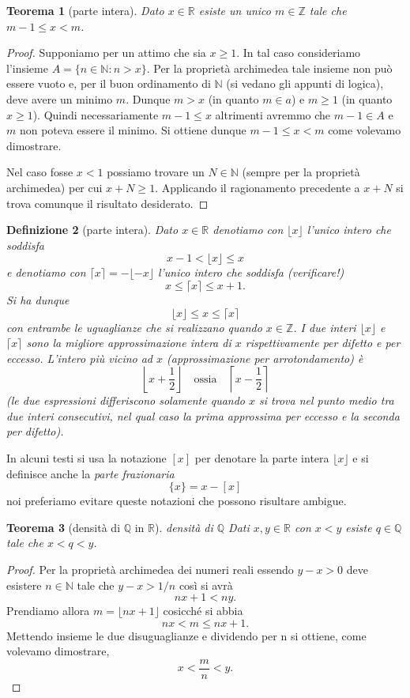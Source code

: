 \documentclass[italian,a4paper,oneside,headinclude]{scrbook}
\newcommand{\NN}{\mathbb N}
\newcommand{\QQ}{\mathbb Q}
\newcommand{\RR}{\mathbb R}
\newcommand{\ZZ}{\mathbb Z}
\newtheorem{theorem}{Teorema}
\newtheorem{definition}[theorem]{Definizione}
\begin{document}
\begin{theorem}[parte intera]
Dato $x\in \RR$ esiste un unico $m\in \ZZ$ tale che $m-1 \le x < m$.
\end{theorem}
%
\begin{proof}
Supponiamo per un attimo che sia $x\ge 1$.
In tal caso consideriamo l'insieme $A=\{n\in \NN\colon n > x\}$.
Per la proprietà archimedea tale insieme non può essere vuoto e,
per il buon ordinamento di $\NN$ (si vedano gli appunti di logica),
deve avere un minimo $m$.
Dunque $m>x$ (in quanto $m\in a$) e $m\ge 1$ (in quanto $x\ge 1$).
Quindi necessariamente $m-1 \le x$ altrimenti avremmo che $m-1\in A$ e $m$
non poteva essere il minimo. Si ottiene dunque $m-1\le x < m$ come volevamo
dimostrare.

Nel caso fosse $x<1$ possiamo trovare un $N\in \NN$ (sempre per la proprietà archimedea) per cui $x+N \ge 1$. Applicando il ragionamento precedente a $x+N$ si trova comunque il risultato desiderato.
\end{proof}

\begin{definition}[parte intera]
Dato $x\in \RR$ denotiamo con $\lfloor x\rfloor$ l'unico intero
che soddisfa
\marginpar{$\lfloor \cdot \rfloor$}
\[
  x - 1 < \lfloor x \rfloor \le x
\]
e denotiamo con $\lceil x \rceil = - \lfloor -x \rfloor$ l'unico intero che soddisfa (verificare!)
\marginpar{$\lceil \cdot \rceil$}
\[
  x \le \lceil x \rceil \le x + 1.
\]
Si ha dunque
\[
  \lfloor x \rfloor \le x \le \lceil x \rceil
\]
con entrambe le uguaglianze che si realizzano quando $x\in \ZZ$.
I due interi $\lfloor x \rfloor$ e $\lceil x \rceil$
sono la migliore approssimazione intera di $x$ rispettivamente
per difetto e per eccesso.
L'intero più vicino ad $x$ (approssimazione per arrotondamento)
è
\[
  \left\lfloor x + \frac 1 2 \right\rfloor
\quad \text{ossia} \quad
  \left\lceil x-\frac 1 2 \right\rceil
\]
(le due espressioni differiscono solamente quando $x$ si trova nel punto medio tra due interi consecutivi, nel qual caso la prima approssima per eccesso e la seconda per difetto).
\end{definition}
In alcuni testi si usa la notazione $[x]$ per denotare la parte intera $\lfloor x \rfloor$ e si definisce
anche la \emph{parte frazionaria}
\[
   \{x\} = x - [x]
\]
noi preferiamo evitare queste notazioni che possono risultare ambigue.

\begin{theorem}[densità di $\QQ$ in $\RR$]
\emph{densità di $\QQ$}
Dati $x,y \in \RR$ con $x<y$ esiste $q\in \QQ$ tale che $x<q<y$.
\end{theorem}
%
\begin{proof}
Per la proprietà archimedea dei numeri reali essendo $y-x>0$
deve esistere $n\in \NN$ tale che $y-x > 1/n$ così si avrà
\[
    nx + 1 < ny.
\]
Prendiamo allora $m=\lfloor nx + 1\rfloor$ cosicché si abbia
\[
  nx < m \le nx + 1.
\]
Mettendo insieme le due disuguaglianze e dividendo per n si ottiene,
come volevamo dimostrare,
\[
 x < \frac{m}{n} < y.
\]
\end{proof}
\end{document}
